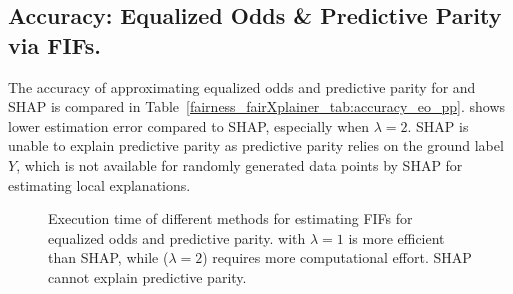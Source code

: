 \subsection{Accuracy: Equalized Odds \& Predictive Parity via FIFs.}
The accuracy of approximating equalized odds and predictive parity for {\fairXplainer} and SHAP is compared in Table~\ref{fairness_fairXplainer_tab:accuracy_eo_pp}. {\fairXplainer} shows lower estimation error compared to SHAP, especially when $\lambda=2$. SHAP is unable to explain predictive parity as predictive parity relies on the ground label $Y$, which is not available for randomly generated data points by SHAP for estimating local explanations.




\begin{figure}
	\centering
	\caption[Execution time of FIFs]{Execution time of different methods for estimating FIFs for equalized odds and predictive parity. {\fairXplainer} with $ \lambda = 1 $ is more efficient than SHAP, while {\fairXplainer} ($ \lambda = 2 $) requires more computational effort. SHAP cannot explain predictive parity. 
	}
	\label{fairness_fairXplainer_fig:execution_time_cactus_plot_eo_pp}
\end{figure}


